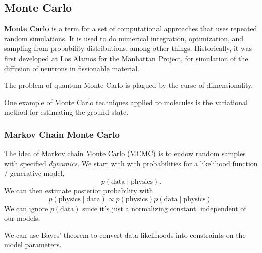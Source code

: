 \documentclass[12pt,letterpaper]{article}
\begin{document}
\subsection{Monte Carlo}
\textbf{Monte Carlo} is a term for a set of computational approaches that uses repeated random simulations. It is used to do numerical integration, optimization, and sampling from probability distributions, among other things. Historically, it was first developed at Los Alamos for the Manhattan Project, for simulation of the diffusion of neutrons in fissionable material.

The problem of quantum Monte Carlo is plagued by the curse of dimensionality.

One example of Monte Carlo techniques applied to molecules is the variational method for estimating the ground state.
\subsubsection{Markov Chain Monte Carlo}
The idea of Markov chain Monte Carlo (MCMC) is to endow random samples with specified \textit{dynamics}. We start with with probabilities for a likelihood function / generative model,
\[p(\text{data}\mid\text{physics}).\]
We can then estimate posterior probability with
\[p(\text{physics}\mid\text{data})\propto p(\text{physics})p(\text{data}\mid\text{physics}).\]
We can ignore $p(\text{data})$ since it's just a normalizing constant, independent of our models.

We can use Bayes' theorem to convert data likelihoods into constraints on the model parameters.
\end{document}
